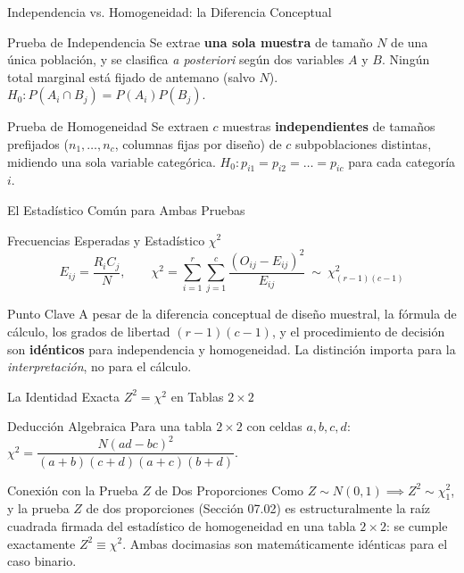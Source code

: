 \documentclass[10pt, aspectratio=169]{beamer}
\begin{document}
\begin{frame}{Independencia vs. Homogeneidad: la Diferencia Conceptual}
  \footnotesize
  \begin{block}{Prueba de Independencia}
    Se extrae \textbf{una sola muestra} de tamaño $N$ de una única población, y se clasifica \emph{a posteriori} según dos variables $A$ y $B$. Ningún total marginal está fijado de antemano (salvo $N$). $H_0: P(A_i\cap B_j)=P(A_i)P(B_j)$.
  \end{block}
  \pause

  \vspace{0.1cm}
  \begin{alertblock}{Prueba de Homogeneidad}
    Se extraen $c$ muestras \textbf{independientes} de tamaños prefijados ($n_1,\ldots,n_c$, columnas fijas por diseño) de $c$ subpoblaciones distintas, midiendo una sola variable categórica. $H_0: p_{i1}=p_{i2}=\ldots=p_{ic}$ para cada categoría $i$.
  \end{alertblock}
\end{frame}

\begin{frame}{El Estadístico Común para Ambas Pruebas}
  \footnotesize
  \begin{block}{Frecuencias Esperadas y Estadístico $\chi^2$}
    $$E_{ij} = \frac{R_i C_j}{N}, \qquad \chi^2 = \sum_{i=1}^r\sum_{j=1}^c \frac{(O_{ij}-E_{ij})^2}{E_{ij}} \ \sim\ \chi^2_{(r-1)(c-1)}$$
  \end{block}
  \pause

  \vspace{0.1cm}
  \begin{alertblock}{Punto Clave}
    A pesar de la diferencia conceptual de diseño muestral, la fórmula de cálculo, los grados de libertad $(r-1)(c-1)$, y el procedimiento de decisión son \textbf{idénticos} para independencia y homogeneidad. La distinción importa para la \emph{interpretación}, no para el cálculo.
  \end{alertblock}
\end{frame}

\begin{frame}{La Identidad Exacta $Z^2=\chi^2$ en Tablas $2\times2$}
  \footnotesize
  \begin{block}{Deducción Algebraica}
    Para una tabla $2\times2$ con celdas $a,b,c,d$: $\chi^2 = \dfrac{N(ad-bc)^2}{(a+b)(c+d)(a+c)(b+d)}$.
  \end{block}
  \pause

  \vspace{0.1cm}
  \begin{alertblock}{Conexión con la Prueba $Z$ de Dos Proporciones}
    Como $Z\sim N(0,1) \implies Z^2\sim\chi^2_1$, y la prueba $Z$ de dos proporciones (Sección 07.02) es estructuralmente la raíz cuadrada firmada del estadístico de homogeneidad en una tabla $2\times2$: se cumple exactamente $Z^2\equiv\chi^2$. Ambas docimasias son matemáticamente idénticas para el caso binario.
  \end{alertblock}
\end{frame}
\end{document}
